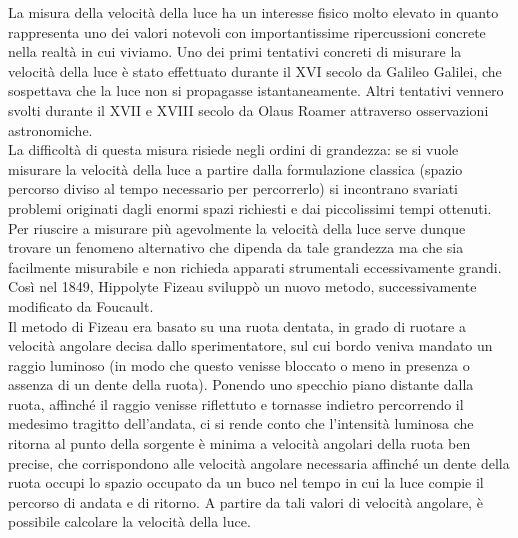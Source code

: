 La misura della velocità della luce ha un interesse fisico molto elevato in quanto rappresenta uno dei valori notevoli con importantissime ripercussioni concrete nella realtà in cui viviamo. Uno dei primi tentativi concreti di misurare la velocità della luce è stato effettuato durante il XVI secolo da Galileo Galilei, che sospettava che la luce non si propagasse istantaneamente. Altri tentativi vennero svolti durante il XVII e XVIII secolo da Olaus Roamer attraverso osservazioni  astronomiche.\\

La difficoltà di questa misura risiede negli ordini di grandezza:  se si vuole misurare la velocità della luce a partire dalla formulazione classica (spazio percorso diviso al tempo necessario per percorrerlo) si incontrano svariati problemi originati dagli enormi spazi richiesti e dai piccolissimi tempi ottenuti. Per riuscire a misurare più agevolmente la velocità della luce serve dunque trovare un fenomeno alternativo che dipenda da tale grandezza ma che sia facilmente misurabile e non richieda apparati strumentali eccessivamente grandi. Così nel 1849, Hippolyte Fizeau sviluppò un nuovo metodo, successivamente modificato da Foucault.\\

Il metodo di Fizeau era basato su una ruota dentata, in grado di ruotare a velocità angolare decisa dallo sperimentatore, sul cui bordo veniva mandato un raggio luminoso (in modo che questo venisse bloccato o meno in presenza o assenza di un dente della ruota). Ponendo uno specchio piano distante dalla ruota, affinché il raggio venisse riflettuto e tornasse indietro percorrendo il medesimo tragitto dell'andata, ci si rende conto che l'intensità luminosa che ritorna al punto della sorgente è minima a velocità angolari della ruota ben precise, che corrispondono alle velocità angolare necessaria affinché un dente della ruota occupi lo spazio occupato da un buco nel tempo in cui la luce compie il percorso di andata e di ritorno. A partire da tali valori di velocità angolare, è possibile calcolare la velocità della luce.\\

